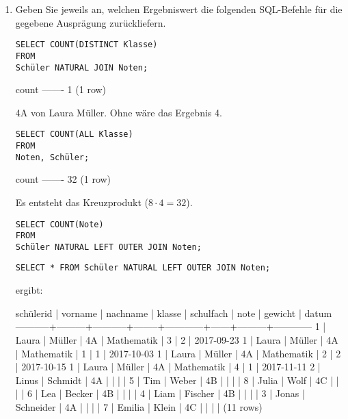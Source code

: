 \documentclass{bschlangaul-aufgabe}
\begin{document}
\begin{enumerate}

\item Geben Sie jeweils an, welchen Ergebniswert die folgenden
SQL-Befehle für die gegebene Ausprägung zurückliefern.

\begin{verbatim}
SELECT COUNT(DISTINCT Klasse)
FROM
Schüler NATURAL JOIN Noten;
\end{verbatim}

\begin{bAntwort}
\begin{bSqlErgebnis}
 count
-------
     1
(1 row)
\end{bSqlErgebnis}
4A von Laura Müller. Ohne  wäre das Ergebnis 4.
\end{bAntwort}

\begin{verbatim}
SELECT COUNT(ALL Klasse)
FROM
Noten, Schüler;
\end{verbatim}

\begin{bAntwort}
\begin{bSqlErgebnis}
 count
-------
    32
(1 row)
\end{bSqlErgebnis}
Es entsteht das Kreuzprodukt ($8 \cdot 4 = 32$).
\end{bAntwort}

\begin{verbatim}
SELECT COUNT(Note)
FROM
Schüler NATURAL LEFT OUTER JOIN Noten;
\end{verbatim}

\begin{bAntwort}
\begin{verbatim}
SELECT * FROM Schüler NATURAL LEFT OUTER JOIN Noten;
\end{verbatim}

ergibt:

\begin{bSqlErgebnis}
 schülerid | vorname | nachname  | klasse | schulfach  | note | gewicht |   datum
-----------+---------+-----------+--------+------------+------+---------+------------
         1 | Laura   | Müller    | 4A     | Mathematik |    3 |       2 | 2017-09-23
         1 | Laura   | Müller    | 4A     | Mathematik |    1 |       1 | 2017-10-03
         1 | Laura   | Müller    | 4A     | Mathematik |    2 |       2 | 2017-10-15
         1 | Laura   | Müller    | 4A     | Mathematik |    4 |       1 | 2017-11-11
         2 | Linus   | Schmidt   | 4A     |            |      |         |
         5 | Tim     | Weber     | 4B     |            |      |         |
         8 | Julia   | Wolf      | 4C     |            |      |         |
         6 | Lea     | Becker    | 4B     |            |      |         |
         4 | Liam    | Fischer   | 4B     |            |      |         |
         3 | Jonas   | Schneider | 4A     |            |      |         |
         7 | Emilia  | Klein     | 4C     |            |      |         |
(11 rows)
\end{bSqlErgebnis}


\end{bAntwort}
\end{enumerate}
\end{document}
